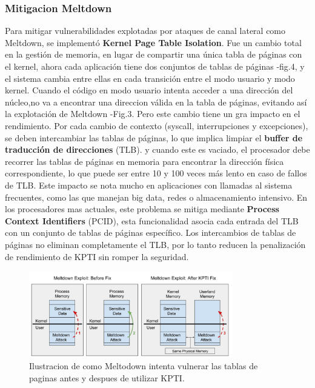 \documentclass[lettersize,compsoc]{IEEEtran}
\begin{document}
\subsubsection{\textbf{Mitigacion Meltdown}}
\noindent  Para mitigar vulnerabilidades explotadas por ataques de canal lateral como Meltdown, se implementó \textbf{Kernel Page Table Isolation}. Fue un cambio total en la gestión de memoria, en lugar de compartir una única tabla de páginas con el kernel, ahora cada aplicación tiene dos conjuntos de tablas de páginas -fig.4, y el sistema cambia entre ellas en cada transición entre el modo usuario y modo kernel. Cuando el código en modo usuario intenta acceder a una dirección del núcleo,no va a encontrar una direccion válida en la tabla de páginas, evitando así la explotación de Meltdown -Fig.3.
\noindent Pero este cambio tiene un gra impacto en el rendimiento. Por cada cambio de contexto (syscall, interrupciones y excepciones), se deben intercambiar las tablas de páginas, lo que implica limpiar el \textbf{buffer de traducción de direcciones} (TLB). y cuando este es  vaciado, el procesador debe recorrer las tablas de páginas en memoria para encontrar la dirección física correspondiente, lo que puede ser entre 10 y 100 veces más lento en caso de fallos de TLB. Este impacto se nota mucho en aplicaciones con llamadas al sistema frecuentes, como las que manejan big data, redes o almacenamiento intensivo.
\noindent                                                                                                                                                                                                               %
\noindent En los procesadores mas actuales, este problema se mitiga mediante \textbf{Process Context Identifiers} (PCID), esta funcionalidad asocia cada entrada del TLB con un conjunto de tablas de páginas específico. Los intercambios de tablas de páginas no eliminan completamente el TLB, por lo tanto reducen la penalización de rendimiento de KPTI sin romper la seguridad.
\begin{figure}[h]
  \centering
  \includegraphics[width=3.5in]{../kpti-meltdown.png}
  \caption{\small Ilustracion de como Meltodown intenta vulnerar las tablas de paginas antes y despues de utilizar KPTI.}
\end{figure}
\end{document}
